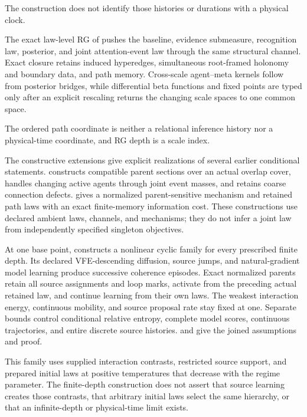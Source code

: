 The construction does not identify those histories or durations with a
physical clock.

The exact law-level RG of  pushes the baseline,
evidence submeasure, recognition law, posterior, and joint attention-event law
through the same structural channel. Exact closure retains induced hyperedges,
simultaneous root-framed holonomy and boundary data, and path memory.
Cross-scale agent--meta kernels follow from posterior bridges, while differential beta
functions and fixed points are typed only after an explicit rescaling returns
the changing scale spaces to one common space.

The ordered path coordinate is neither a relational inference history nor a
physical-time coordinate, and RG depth is a scale index.

The constructive extensions give explicit realizations of several earlier
conditional statements.  constructs compatible
parent sections over an actual overlap cover, handles changing active agents
through joint event masses, and retains coarse connection defects.
 gives a normalized parent-sensitive mechanism and
retained path laws with an exact finite-memory information cost. These
constructions use declared ambient laws, channels, and mechanisms; they do
not infer a joint law from independently specified singleton objectives.

At one base point,  constructs a nonlinear
cyclic family for every prescribed finite depth. Its declared VFE-descending
diffusion, source jumps, and natural-gradient model learning produce
successive coherence episodes. Exact normalized parents retain all source
assignments and loop marks, activate from the preceding actual retained law,
and continue learning from their own laws. The weakest interaction energy,
continuous mobility, and source proposal rate stay fixed at one. Separate
bounds control conditional relative entropy, complete model scores,
continuous trajectories, and entire discrete source histories.
 and
 give the joined assumptions and proof.

This family uses supplied interaction contrasts, restricted source support,
and prepared initial laws at positive temperatures that decrease with the
regime parameter. The finite-depth construction does not assert that source
learning creates those contrasts, that arbitrary initial laws select the
same hierarchy, or that an infinite-depth or physical-time limit exists.

